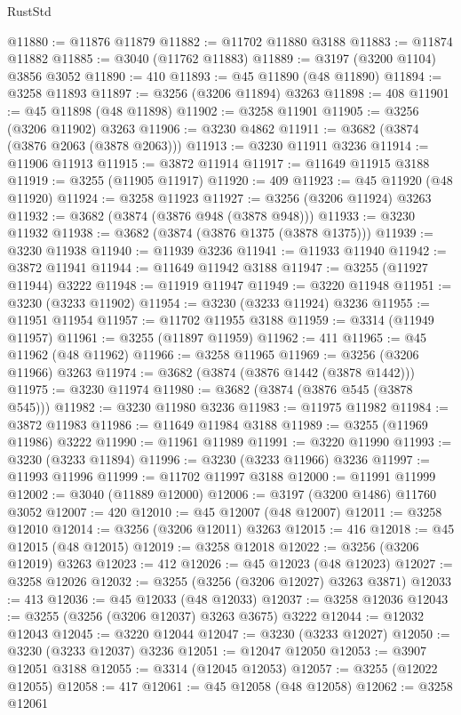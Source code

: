 \begin{lexlean}{RustStd}
\begin{coremodule}
@11880 := @11876 @11879
@11882 := @11702 @11880 @3188
@11883 := @11874 @11882
@11885 := @3040 (@11762 @11883)
@11889 := @3197 (@3200 @1104) @3856 @3052
@11890 := 410
@11893 := @45 @11890 (@48 @11890)
@11894 := @3258 @11893
@11897 := @3256 (@3206 @11894) @3263
@11898 := 408
@11901 := @45 @11898 (@48 @11898)
@11902 := @3258 @11901
@11905 := @3256 (@3206 @11902) @3263
@11906 := @3230 @4862
@11911 := @3682 (@3874 (@3876 @2063 (@3878 @2063)))
@11913 := @3230 @11911 @3236
@11914 := @11906 @11913
@11915 := @3872 @11914
@11917 := @11649 @11915 @3188
@11919 := @3255 (@11905 @11917)
@11920 := 409
@11923 := @45 @11920 (@48 @11920)
@11924 := @3258 @11923
@11927 := @3256 (@3206 @11924) @3263
@11932 := @3682 (@3874 (@3876 @948 (@3878 @948)))
@11933 := @3230 @11932
@11938 := @3682 (@3874 (@3876 @1375 (@3878 @1375)))
@11939 := @3230 @11938
@11940 := @11939 @3236
@11941 := @11933 @11940
@11942 := @3872 @11941
@11944 := @11649 @11942 @3188
@11947 := @3255 (@11927 @11944) @3222
@11948 := @11919 @11947
@11949 := @3220 @11948
@11951 := @3230 (@3233 @11902)
@11954 := @3230 (@3233 @11924) @3236
@11955 := @11951 @11954
@11957 := @11702 @11955 @3188
@11959 := @3314 (@11949 @11957)
@11961 := @3255 (@11897 @11959)
@11962 := 411
@11965 := @45 @11962 (@48 @11962)
@11966 := @3258 @11965
@11969 := @3256 (@3206 @11966) @3263
@11974 := @3682 (@3874 (@3876 @1442 (@3878 @1442)))
@11975 := @3230 @11974
@11980 := @3682 (@3874 (@3876 @545 (@3878 @545)))
@11982 := @3230 @11980 @3236
@11983 := @11975 @11982
@11984 := @3872 @11983
@11986 := @11649 @11984 @3188
@11989 := @3255 (@11969 @11986) @3222
@11990 := @11961 @11989
@11991 := @3220 @11990
@11993 := @3230 (@3233 @11894)
@11996 := @3230 (@3233 @11966) @3236
@11997 := @11993 @11996
@11999 := @11702 @11997 @3188
@12000 := @11991 @11999
@12002 := @3040 (@11889 @12000)
@12006 := @3197 (@3200 @1486) @11760 @3052
@12007 := 420
@12010 := @45 @12007 (@48 @12007)
@12011 := @3258 @12010
@12014 := @3256 (@3206 @12011) @3263
@12015 := 416
@12018 := @45 @12015 (@48 @12015)
@12019 := @3258 @12018
@12022 := @3256 (@3206 @12019) @3263
@12023 := 412
@12026 := @45 @12023 (@48 @12023)
@12027 := @3258 @12026
@12032 := @3255 (@3256 (@3206 @12027) @3263 @3871)
@12033 := 413
@12036 := @45 @12033 (@48 @12033)
@12037 := @3258 @12036
@12043 := @3255 (@3256 (@3206 @12037) @3263 @3675) @3222
@12044 := @12032 @12043
@12045 := @3220 @12044
@12047 := @3230 (@3233 @12027)
@12050 := @3230 (@3233 @12037) @3236
@12051 := @12047 @12050
@12053 := @3907 @12051 @3188
@12055 := @3314 (@12045 @12053)
@12057 := @3255 (@12022 @12055)
@12058 := 417
@12061 := @45 @12058 (@48 @12058)
@12062 := @3258 @12061

\end{coremodule}
\end{lexlean}
